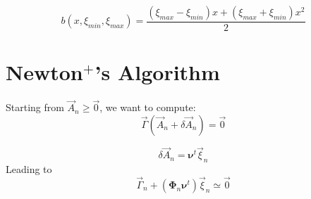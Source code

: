 \documentclass[aps,onecolumn,11pt]{revtex4}
\begin{document}
\begin{equation}
	b(x,\xi_{min},\xi_{max}) = \dfrac{ \left(\xi_{max}-\xi_{min}\right) x + \left(\xi_{max}+\xi_{min}\right) x^2 }{2}
\end{equation}  
   
\section{Newton$^+$'s Algorithm}

Starting from $\vec{A}_n\geq\vec{0}$, we want to compute:
\begin{equation}
	\vec{\Gamma}(\vec{A}_n+\delta\vec{A}_n) = \vec{0}
\end{equation}
	
\begin{equation}
	\delta\vec{A}_n = \bm{\nu}^t \vec{\xi}_n
\end{equation}
Leading to
\begin{equation}
	\vec{\Gamma}_n + (\bm{\Phi}_n \bm{\nu}^t ) \vec{\xi}_n \simeq \vec{0}
\end{equation}
 
\end{document}
